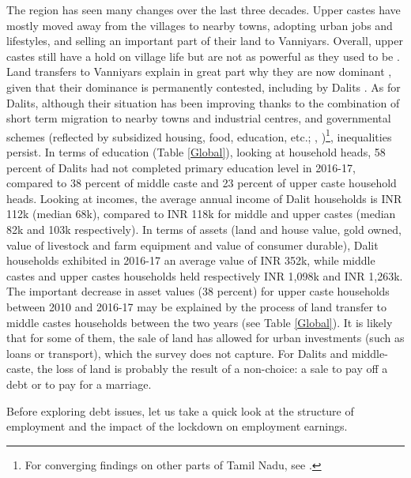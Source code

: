 \documentclass[a4paper, 11pt, onecolumn]{article}
\begin{document}
The region has seen many changes over the last three decades. 
Upper castes have mostly moved away from the villages to nearby towns, adopting urban jobs and lifestyles, and selling an important part of their land to Vanniyars. 
Overall, upper castes still have a hold on village life but are not as powerful as they used to be \citep{Harriss2013}. 
Land transfers to Vanniyars explain in great part why they are now dominant \citep{Harriss2016}, given that their dominance is permanently contested, including by Dalits \citep{Pandian2000}. 
As for Dalits, although their situation has been improving thanks to the combination of short term migration to nearby towns and industrial centres, and governmental schemes (reflected by subsidized housing, food, education, etc.; \citeauthor{Guerin2014}, \citeyear{Guerin2014})\footnote{For converging findings on other parts of Tamil Nadu, see \cite{Heyer2012, Harriss2016}.}, inequalities persist.
In terms of education (Table \ref{Global}), looking at household heads, 58 percent of Dalits had not completed primary education level in 2016-17, compared to 38 percent of middle caste and 23 percent of upper caste household heads. 
Looking at incomes, the average annual income of Dalit households is INR 112k (median 68k), compared to INR 118k for middle and upper castes (median 82k and 103k respectively).
In terms of assets (land and house value, gold owned, value of livestock and farm equipment and value of consumer durable), Dalit households exhibited in 2016-17 an average value of INR 352k, while middle castes and upper castes households held respectively INR 1,098k and INR 1,263k.
The important decrease in asset values (38 percent) for upper caste households between 2010 and 2016-17 may be explained by the process of land transfer to middle castes households between the two years (see Table \ref{Global}).
It is likely that for some of them, the sale of land has allowed for urban investments (such as loans or transport), which the survey does not capture. 
For Dalits and middle-caste, the loss of land is probably the result of a non-choice: a sale to pay off a debt or to pay for a marriage.

Before exploring debt issues, let us take a quick look at the structure of employment and the impact of the lockdown on employment earnings.
\end{document}
